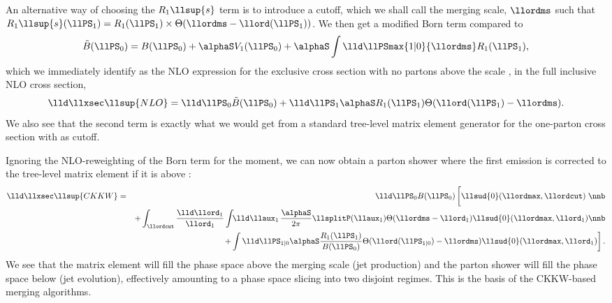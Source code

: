 An alternative way of choosing the $R_1\llsup{s}$ term is to introduce
a cutoff, which we shall call the merging scale, $\llordms$ such that
$R_1\llsup{s}(\llPS_1)=R_1(\llPS_1)\times\Theta(\llordms-\llord(\llPS_1))$.
We then get a modified Born term compared to 
\begin{equation}
  \label{eq:matching:exclusiveborn}
  \tilde{B}(\llPS_{0}) =
  B(\llPS_{0})+\alphaS V_1(\llPS_{0})
  + \alphaS\int\lld\llPSmax{1|0}{\llordms} R_1(\llPS_{1}),
\end{equation}
which we immediately identify as the NLO expression for the exclusive
cross section with no partons above the scale \llordms, in the full
inclusive NLO cross section,
\begin{equation}
  \label{eq:matching:NLO4}
  \lld\llxsec\llsup{NLO}=
  \lld\llPS_0\tilde{B}(\llPS_{0})+
  \lld\llPS_1\alphaS R_1(\llPS_1)\Theta(\llord(\llPS_1)-\llordms).
\end{equation}
We also see that the second term is exactly what we would get from a
standard tree-level matrix element generator for the one-parton cross
section with \llordms as cutoff.


Ignoring the NLO-reweighting of the Born term for the moment, we can
now obtain a parton shower where the first emission is corrected to
the tree-level matrix element if it is above \llordms:
\begin{eqnarray}
  \label{eq:matching:CKKWfirst}
  \lld\llxsec\llsup{CKKW}&=&
  \lld\llPS_0B(\llPS_0)\left[\llsud{0}(\llordmax,\llordcut)
    \vphantom{\int\frac{R_1}{B}}\right.\nnb\\
    &&+\int_{\llordcut}\frac{\lld\llord_1}{\llord_1}
    \int\!\!\lld\llaux_1\,\frac{\alphaS}{2\pi}\llsplitP(\llaux_1)
    \Theta(\llordms-\llord_1)
    \llsud{0}(\llordmax,\llord_1)\nnb\\
    &&\left.+\int\lld\llPS_{1|0}\alphaS
    \frac{R_1(\llPS_1)}{B(\llPS_0)}\Theta(\llord(\llPS_{1|0})-\llordms)
    \llsud{0}(\llordmax,\llord_1)\right].
\end{eqnarray}
We see that the matrix element will fill the phase space above the
merging scale (jet production) and the parton shower will fill the
phase space below (jet evolution), effectively amounting to a phase
space slicing into two disjoint regimes. This is the basis of the
CKKW-based merging algorithms\cite{Catani:2001cc,Lonnblad:2001iq}.


